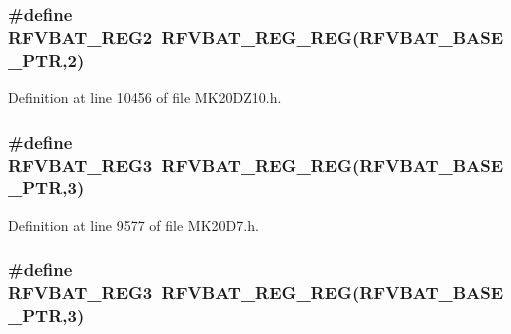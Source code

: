 \subsubsection[{\texorpdfstring{R\+F\+V\+B\+A\+T\+\_\+\+R\+E\+G2}{RFVBAT_REG2}}]{\setlength{\rightskip}{0pt plus 5cm}\#define R\+F\+V\+B\+A\+T\+\_\+\+R\+E\+G2~{\bf R\+F\+V\+B\+A\+T\+\_\+\+R\+E\+G\+\_\+\+R\+EG}({\bf R\+F\+V\+B\+A\+T\+\_\+\+B\+A\+S\+E\+\_\+\+P\+TR},2)}\hypertarget{group___r_f_v_b_a_t___register___accessor___macros_ga2cb98ee1f823c18c81f270beb24b359a}{}\label{group___r_f_v_b_a_t___register___accessor___macros_ga2cb98ee1f823c18c81f270beb24b359a}


Definition at line 10456 of file M\+K20\+D\+Z10.\+h.

\subsubsection[{\texorpdfstring{R\+F\+V\+B\+A\+T\+\_\+\+R\+E\+G3}{RFVBAT_REG3}}]{\setlength{\rightskip}{0pt plus 5cm}\#define R\+F\+V\+B\+A\+T\+\_\+\+R\+E\+G3~{\bf R\+F\+V\+B\+A\+T\+\_\+\+R\+E\+G\+\_\+\+R\+EG}({\bf R\+F\+V\+B\+A\+T\+\_\+\+B\+A\+S\+E\+\_\+\+P\+TR},3)}\hypertarget{group___r_f_v_b_a_t___register___accessor___macros_ga7d8455bad7fb104b0a327253883e0df9}{}\label{group___r_f_v_b_a_t___register___accessor___macros_ga7d8455bad7fb104b0a327253883e0df9}


Definition at line 9577 of file M\+K20\+D7.\+h.

\subsubsection[{\texorpdfstring{R\+F\+V\+B\+A\+T\+\_\+\+R\+E\+G3}{RFVBAT_REG3}}]{\setlength{\rightskip}{0pt plus 5cm}\#define R\+F\+V\+B\+A\+T\+\_\+\+R\+E\+G3~{\bf R\+F\+V\+B\+A\+T\+\_\+\+R\+E\+G\+\_\+\+R\+EG}({\bf R\+F\+V\+B\+A\+T\+\_\+\+B\+A\+S\+E\+\_\+\+P\+TR},3)}\hypertarget{group___r_f_v_b_a_t___register___accessor___macros_ga7d8455bad7fb104b0a327253883e0df9}{}\label{group___r_f_v_b_a_t___register___accessor___macros_ga7d8455bad7fb104b0a327253883e0df9}


